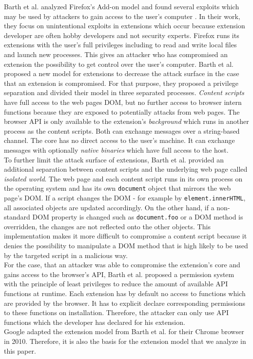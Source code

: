 	Barth et al. analyzed Firefox's Add-on model and found several exploits which may be used by attackers to gain access to the user's computer \cite{Barth10protectingbrowsers}. In their work, they focus on unintentional exploits in extensions which occur because extension developer are often hobby developers and not security experts. Firefox runs its extensions with the user's full privileges including to read and write local files and launch new processes. This gives an attacker who has compromised an extension the possibility to get control over the user's computer. Barth et al. proposed a new model for extensions to decrease the attack surface in the case that an extension is compromised. For that purpose, they proposed a privilege separation and divided their model in three separated processes. \textit{Content scripts} have full access to the web pages DOM, but no further access to browser intern functions because they are exposed to potentially attacks from web pages. The browser API is only available to the extension's \textit{background} which runs in another process as the content scripts. Both can exchange messages over a string-based channel. The core has no direct access to the user's machine. It can exchange messages with optionally \textit{native binaries} which have full access to the host. \\
	To further limit the attack surface of extensions, Barth et al. provided an additional separation between content scripts and the underlying web page called \textit{isolated world}. The web page and each content script runs in its own process on the operating system and has its own \texttt{document} object that mirrors the web page's DOM. If a script changes the DOM - for example by \texttt{element.innerHTML}, all associated objects are updated accordingly. On the other hand, if a non-standard DOM property is changed such as \texttt{document.foo} or a DOM method is overridden, the changes are not reflected onto the other objects. This implementation makes it more difficult to compromise a content script because it denies the possibility to manipulate a DOM method that is high likely to be used by the targeted script in a malicious way. \\
	For the case, that an attacker was able to compromise the extension's core and gains access to the browser's API, Barth et al. proposed a permission system with the principle of least privileges to reduce the amount of available API functions at runtime. Each extension has by default no access to functions which are provided by the browser. It has to explicit declare corresponding permissions to these functions on installation. Therefore, the attacker can only use API functions which the developer has declared for his extension. \\
	Google adapted the extension model from Barth et al. for their Chrome browser in 2010. Therefore, it is also the basis for the extension model that we analyze in this paper.
	
